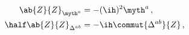 \begin{equation}
  \begin{split}
\label{eq:masterZ}
\ab{Z}{Z}_{\myth^a}&=-(\ih)^2\myth^a\,,\\
\half\ab{Z}{Z}_{\Delta^{ab}}&=-\ih\commut{\Delta^{ab}}{Z}\,,
\end{split}
\end{equation}

